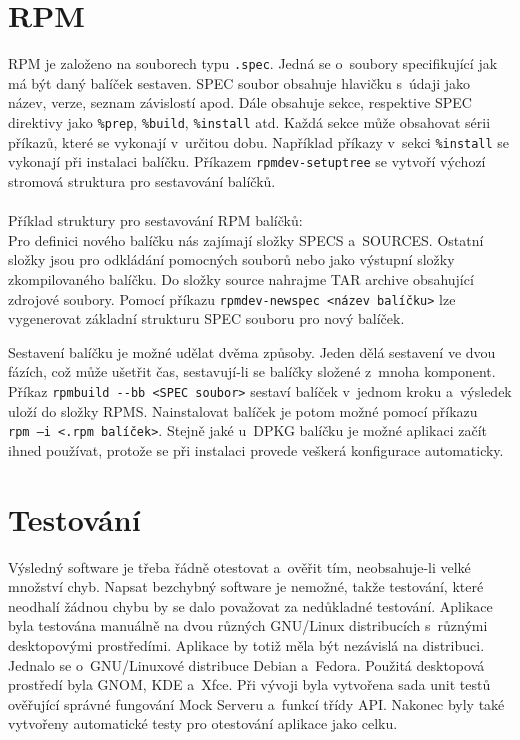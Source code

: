 \section{RPM}

RPM je založeno na souborech typu \texttt{.spec}. Jedná se o soubory specifikující jak má být daný balíček sestaven. SPEC soubor obsahuje hlavičku s údaji jako název, verze, seznam
závislostí apod. Dále obsahuje sekce, respektive SPEC direktivy jako \texttt{\%prep}, \texttt{\%build}, \texttt{\%install} atd. Každá sekce může obsahovat sérii příkazů,
které se vykonají v určitou dobu. Například příkazy v sekci \texttt{\%install} se vykonají při instalaci balíčku. Příkazem \texttt{rpmdev-setuptree} se vytvoří výchozí stromová
struktura pro sestavování balíčků. \cite{rpm}
\\\\
\noindent Příklad struktury pro sestavování RPM balíčků: 
\\
\bigskip
Pro definici nového balíčku nás zajímají složky SPECS a SOURCES. Ostatní složky jsou pro odkládání pomocných souborů nebo jako výstupní složky zkompilovaného balíčku.
Do složky source nahrajme TAR archive obsahující zdrojové soubory. Pomocí příkazu \texttt{\mbox{rpmdev-newspec <název balíčku>}} lze vygenerovat základní strukturu SPEC 
souboru pro nový balíček.

Sestavení balíčku je možné udělat dvěma způsoby. Jeden dělá sestavení ve dvou fázích, což může ušetřit čas, sestavují-li se balíčky složené z mnoha komponent.
Příkaz \texttt{\mbox{rpmbuild -{}-bb <SPEC soubor>}} sestaví balíček v jednom kroku a výsledek uloží do složky RPMS. Nainstalovat balíček je potom možné pomocí
příkazu \texttt{\mbox{rpm –i <.rpm balíček>}}. Stejně jaké u DPKG balíčku je možné aplikaci začít ihned používat, protože se při instalaci provede veškerá konfigurace 
automaticky. \cite{rpm}

\section{Testování}

Výsledný software je třeba řádně otestovat a ověřit tím, neobsahuje-li velké množství chyb. Napsat bezchybný software je nemožné, takže testování, které neodhalí
žádnou chybu by se dalo považovat za nedůkladné testování. Aplikace byla testována manuálně na dvou různých GNU/Linux distribucích s různými desktopovými prostředími.
Aplikace by totiž měla být nezávislá na distribuci. Jednalo se o GNU/Linuxové distribuce Debian a Fedora. Použitá desktopová prostředí byla GNOM, KDE a Xfce. Při
vývoji byla vytvořena sada unit testů ověřující správné fungování Mock Serveru a funkcí třídy API. Nakonec byly také vytvořeny automatické testy pro otestování aplikace
jako celku.

